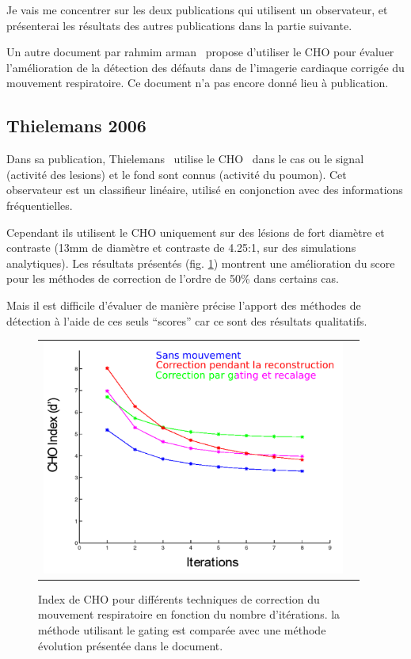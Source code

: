Je vais me concentrer sur les deux publications qui utilisent un observateur, et présenterai les résultats des autres publications dans la partie suivante.

Un autre document par rahmim arman~\cite{rahmim4d} propose d'utiliser le CHO pour évaluer l'amélioration de la détection des défauts dans de l'imagerie cardiaque corrigée du mouvement respiratoire. Ce document n'a pas encore donné lieu à publication.

\subsection{Thielemans 2006}

Dans sa publication, Thielemans~\cite{Thielemans2006Lesion} utilise le CHO~\cite{barrett1993model} dans le cas ou le signal (activité des lesions) et le fond sont connus (activité du poumon). Cet observateur est un classifieur linéaire, utilisé en conjonction avec des informations fréquentielles. 

Cependant ils utilisent le CHO uniquement sur des lésions de fort diamètre et contraste (13mm de diamètre et contraste de 4.25:1, sur des simulations analytiques). Les résultats présentés (fig. \ref{fig:apportCHO}) montrent une amélioration du score pour les méthodes de correction de l'ordre de 50\% dans certains cas. 

Mais il est difficile d'évaluer de manière précise l'apport des méthodes de détection à l'aide de ces seuls ``scores'' car ce sont des résultats qualitatifs. 

\begin{figure}[h!]
	\begin{center}
		\begin{tabular}{c c}
			\includegraphics[width=10cm]{images/apportCHO}
		\end{tabular}
	\end{center}
	\caption{Index de CHO pour différents techniques de correction du mouvement respiratoire en fonction du nombre d'itérations. la méthode utilisant le gating est comparée avec une méthode évolution présentée dans le document.} 
	\label{fig:apportCHO}
\end{figure}


